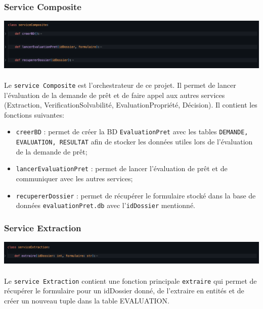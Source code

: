 \documentclass{article}
\begin{document}
        \subsubsection{Service Composite}
            \includegraphics[width=\textwidth]{Images/11.2/composite.png} \\ \\ 
            Le \texttt{service Composite} est l'orchestrateur de ce projet. Il permet de lancer l'évaluation de la demande de prêt et de faire appel aux autres services (Extraction, VerificationSolvabilité, EvaluationPropriété, Décision). Il contient les fonctions suivantes:
            
            \begin{itemize}
            \item \texttt{creerBD} : permet de créer la BD \texttt{EvaluationPret} avec les tables \texttt{DEMANDE, EVALUATION, RESULTAT} afin de stocker les données utiles lors de l'évaluation de la demande de prêt;
            \item \texttt{lancerEvaluationPret} : permet de lancer l'évaluation de prêt et de communiquer avec les autres services;
            \item \texttt{recupererDossier} : permet de récupérer le formulaire stocké dans la base de données \texttt{evaluationPret.db} avec l'\texttt{idDossier} mentionné.
            \end{itemize}


        \subsubsection{Service Extraction}
            \includegraphics[width=\textwidth]{Images/11.2/extraction.png} \\ \\ 
            Le \texttt{service Extraction} contient une fonction principale \texttt{extraire} qui permet de récupérer le formulaire pour un idDossier donné, de l'extraire en entités et de créer un nouveau tuple dans la table EVALUATION.
\end{document}
